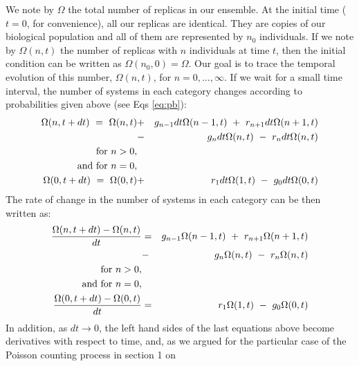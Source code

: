 We note by $\Omega$ the total number of replicas in our ensemble. At the initial time ($t=0$, for convenience), all our replicas are identical. They are copies of our biological population and all of them are represented by $n_0$ individuals. If we note by $\Omega(n,t)$ the number of replicas with $n$ individuals at time $t$, then the initial condition can be written as $\Omega(n_0,0)=\Omega$. Our goal is to trace the temporal evolution of this number, $\Omega(n,t)$, for $n=0, \dots, \infty$. If we wait for a small time interval, the number of systems in each category changes according to probabilities given above (see Eqs \ref{eq:pb}):
\begin{eqnarray}
\Omega(n,t+dt) \,\, = \,\, \Omega(n,t)  & + & g_{n-1} dt \Omega(n-1,t) \,\, + \,\, r_{n+1} dt \Omega(n+1,t) \nonumber \\
                              & - & g_n dt \Omega(n,t) \,\, - \,\,r_n dt \Omega(n,t)                        \nonumber \\
\textup{for} \,\, n > 0,      &   &                                                                         \nonumber \\        
\textup{and for} \,\, n = 0,  &   &                                                                         \nonumber \\
\Omega(0,t+dt) \,\, = \,\, \Omega(0,t)  & + & r_1 dt \Omega(1,t) \,\, - \,\, g_0 dt \Omega(0,t)             
\end{eqnarray}
The rate of change in the number of systems in each category can be then written as:
\begin{eqnarray}
\frac{\Omega(n,t+dt) - \Omega(n,t)}{dt} & = & g_{n-1} \Omega(n-1,t) \,\, + \,\, r_{n+1} \Omega(n+1,t) \nonumber \\
                                        & - & g_n \Omega(n,t) \,\, - \,\, r_n  \Omega(n,t)            \nonumber \\
\textup{for} \,\, n > 0,                &   &                                                         \nonumber \\        
\textup{and for} \,\, n = 0,            &   &                                                         \nonumber \\
\frac{\Omega(0,t+dt) - \Omega(0,t)}{dt} & = & r_1  \Omega(1,t) \,\, - \,\, g_0 \Omega(0,t)             
\end{eqnarray}
In addition, as $dt \rightarrow 0$, the left hand sides of the last equations above become derivatives with respect to time, and, as we argued for the particular case of the Poisson counting process in section 1 on %
